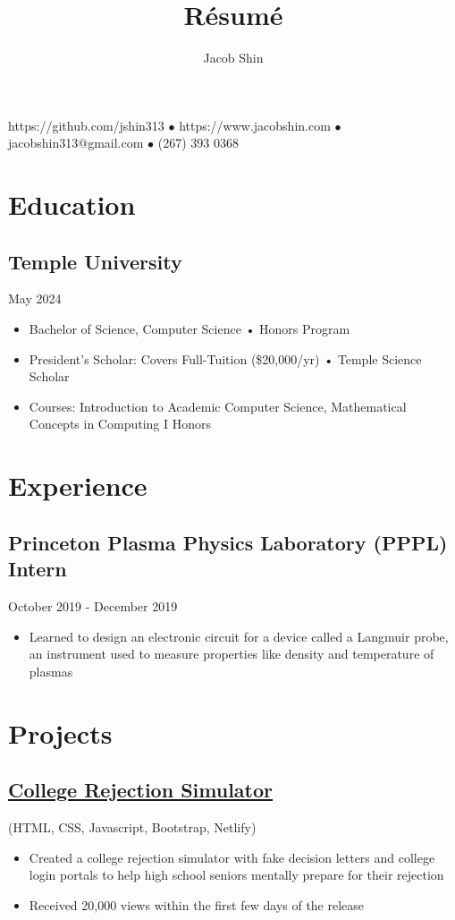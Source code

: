 \documentclass{article}
\makeatletter
\renewcommand{\maketitle}{
    \begin{center}
        {\huge\bfseries
        \theauthor}
    \end{center}
    \begin{center}
        \vspace{1em}
        \leavevmode
        https://github.com/jshin313 $\bullet$ https://www.jacobshin.com $\bullet$ jacobshin313@gmail.com $\bullet$ (267) 393 0368
    \end{center}
}
\makeatother
\begin{document}
\title{R\'esum\'e}
\author{Jacob Shin}

\maketitle
\section{Education}
\subsection{Temple University}\hspace{33em}May 2024
\begin{itemize}
    \item Bachelor of Science, Computer Science • Honors Program
    \item President's Scholar: Covers Full-Tuition (\$20,000/yr) • Temple Science Scholar
    \item Courses: Introduction to Academic Computer Science, Mathematical Concepts in Computing I Honors 
\end{itemize}

\section{Experience}
\subsection{Princeton Plasma Physics Laboratory (PPPL) Intern}\hspace{7em}October 2019 - December 2019
\begin{itemize}
    \item Learned to design an electronic circuit for a device called a Langmuir probe, an instrument used to measure properties like density and temperature of plasmas
\end{itemize}

\section{Projects}
\subsection{\href{https://ivyhub.org/decision-letters/}{College Rejection Simulator}} (HTML, CSS, Javascript, Bootstrap, Netlify)
\begin{itemize}
    \item Created a college rejection simulator with fake decision letters and college login portals to help high school seniors mentally prepare for their rejection
    \item Received 20,000 views within the first few days of the release
\end{itemize}
\end{document}
